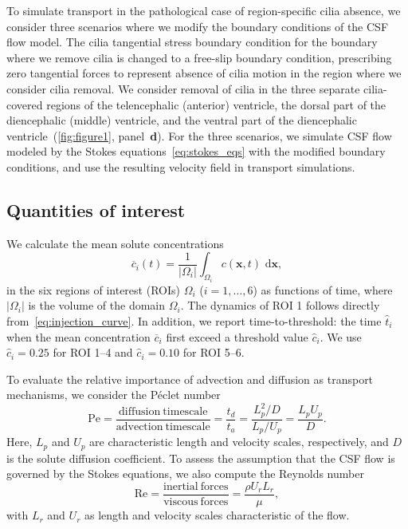 \documentclass[fleqn]{wlscirep}
\newcommand{\dx}{\, \mathrm d\bm{x}}
\newcommand{\xx}{\bm{x}}
\begin{document}
To simulate transport in the pathological case of region-specific cilia absence, we consider three scenarios where we modify the boundary conditions of the CSF flow model. The cilia tangential stress boundary condition for the boundary where we remove cilia is changed to a free-slip boundary condition, prescribing zero tangential forces to represent absence of cilia motion in the region where we consider cilia removal. We consider removal of cilia in the three separate cilia-covered regions of the telencephalic (anterior) ventricle, the dorsal part of the diencephalic (middle) ventricle, and the ventral part of the diencephalic ventricle~(\cref{fig:figure1}, panel~\textbf{d}). For the three scenarios, we simulate CSF flow modeled by the Stokes equations~\eqref{eq:stokes_eqs} with the modified boundary conditions, and use the resulting velocity field in transport simulations.


\subsection*{Quantities of interest}
We calculate the mean solute concentrations
\begin{equation}
    \overline{c}_i(t) = \frac{1}{|\Omega_i|}\int_{\Omega_i} c(\xx, t)\,\dx,
    \label{eq:c_mean_i}
\end{equation}
in the six regions of interest (ROIs) $\Omega_i$ ($i = 1, \dots, 6$) as functions of time, where $|\Omega_i|$ is the volume of the domain $\Omega_i$. The dynamics of ROI 1 follows directly from~\eqref{eq:injection_curve}. In addition, we report time-to-threshold: the time $\hat{t}_i$ when the mean concentration $\overline{c}_i$ first exceed a threshold value $\hat{c}_i$. We use $\hat{c}_i=0.25$ for ROI 1--4 and $\hat{c}_i=0.10$ for ROI 5--6.

To evaluate the relative importance of advection and diffusion as transport mechanisms, we consider the Péclet number
\begin{equation*}
    \mathrm{Pe} = \frac{\mathrm{diffusion \ timescale}}{\mathrm{advection \ timescale}} = \frac{t_d}{t_a} = \frac{L_p^2/D}{L_p/U_p} = \frac{L_p U_p}{D}.
\end{equation*}
Here, $L_p$ and $U_p$ are characteristic length and velocity scales, respectively, and $D$ is the solute diffusion coefficient. To assess the assumption that the CSF flow is governed by the Stokes equations, we also compute the Reynolds number
\begin{equation*}
    \mathrm{Re} = \frac{\mathrm{inertial \ forces}}{\mathrm{viscous \ forces}} = \frac{\rho U_r L_r}{\mu},
\end{equation*}
with $L_r$ and $U_r$ as length and velocity scales characteristic of the flow. 
\end{document}
